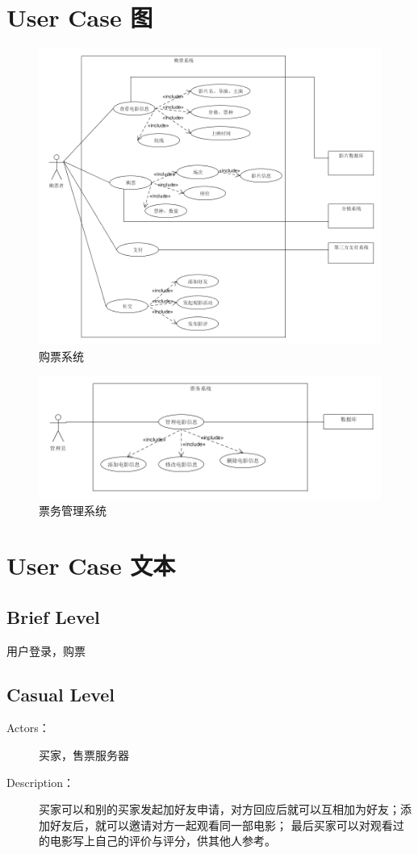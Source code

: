 \documentclass[a4paper]{article}
\begin{document}
  \section{User Case 图}
  \begin{figure}[H]
    \centering
    \includegraphics[width=\textwidth]{buyer.png}
    \caption{购票系统}
  \end{figure}
  \begin{figure}[H]
    \centering
    \includegraphics[width=\textwidth]{admin.png}
    \caption{票务管理系统}
  \end{figure}
  \section{User Case 文本}
  \subsection*{Brief Level}
  \par 用户登录，购票
  \subsection*{Casual Level}
  \begin{description}
    \item[Actors：] 买家，售票服务器
    \item[Description：] 买家可以和别的买家发起加好友申请，对方回应后就可以互相加为好友；添加好友后，就可以邀请对方一起观看同一部电影；
    最后买家可以对观看过的电影写上自己的评价与评分，供其他人参考。
  \end{description}
\end{document}
